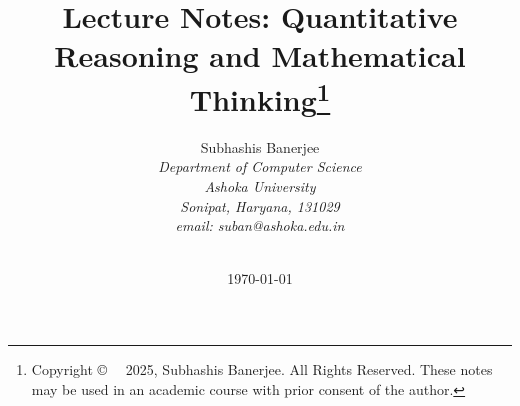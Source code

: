 \documentclass{book}
\begin{document}
\title{\Large\bf Lecture Notes: Quantitative Reasoning and Mathematical Thinking\footnote{
Copyright \copyright~~  2025, Subhashis Banerjee.
 All Rights Reserved. These notes may be used in an academic
course with prior consent of the author.}
}

\author{Subhashis Banerjee\\[2mm]
{\em	Department of Computer Science } \\
{\em	Ashoka University} \\
{\em	Sonipat, Haryana, 131029 }\\
{\em	email: suban@ashoka.edu.in} \\
\\
}

\date{\today}

\maketitle
\tableofcontents












\end{document}
